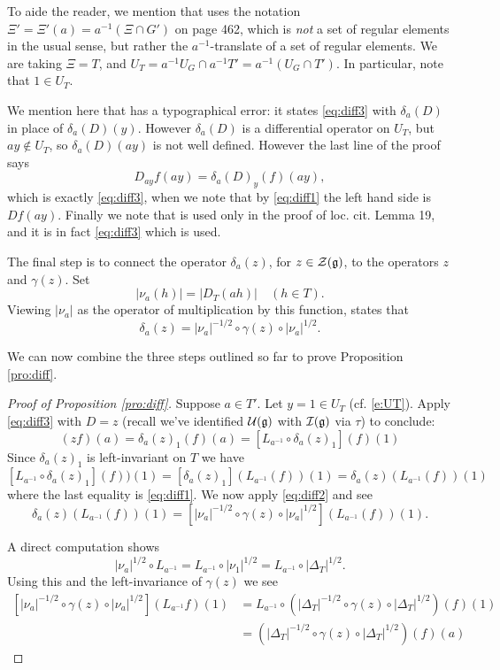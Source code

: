 \documentclass{article}
\theoremstyle{definition}
\numberwithin{equation}{section}
\renewcommand{\-}{\hyp{}}
\newcommand{\g}{\mathfrak g}
\begin{document}
To aide the reader, we mention that \cite[Lemma 18]{HC_inv_eigen} uses the notation $\Xi'=\Xi'(a)=a^{-1}(\Xi\cap G')$ on page 462, which is \emph{not} a set of regular elements in the usual sense, but rather the $a^{-1}$-translate of a set of regular elements. We are taking $\Xi=T$, and $U_T=a^{-1}U_G \cap a^{-1}T'=a^{-1}(U_G\cap T')$. In particular, note that $1 \in U_T$.


We mention here that  \cite[Lemma 18]{HC_inv_eigen} has a typographical error: it states \eqref{eq:diff3} with $\delta_a(D)$ in place of  $\delta_a(D)(y)$.  However $\delta_a(D)$ is a differential operator on $U_T$, but $ay\not\in U_T$, so $\delta_a(D)(ay)$ is not well defined.
However the last line of the proof  says
\[ D_{ay}f(ay) = \delta_a(D)_y(f)(ay), \]
which is exactly \eqref{eq:diff3}, when we note that by \eqref{eq:diff1}  the left hand side is $Df(ay)$.
Finally we note that \cite[Lemma 18]{HC_inv_eigen} is used only in the proof of loc. cit. Lemma 19, and it is in fact \eqref{eq:diff3} which is used.



The final step is to connect the operator $\delta_a(z)$, for $z \in \mathcal{Z}(\mathfrak{g})$, to the operators $z$ and $\gamma(z)$.
Set 
\[
|\nu_a(h)| = |D_T(ah)|\quad(h\in T).
\]
Viewing $|\nu_a|$ as the operator of multiplication by this function, 
\cite[\S6, Lemma 13]{HC_inv_eigen} states that
\begin{equation} \label{eq:diff2}
\delta_a(z) = |\nu_a|^{-1/2} \circ \gamma(z) \circ |\nu_a|^{1/2}.
\end{equation}

We can now combine the three steps outlined so far to prove Proposition \ref{pro:diff}.
\begin{proof}[Proof of Proposition \ref{pro:diff}]
Suppose $a\in T'$. Let $y=1\in U_T$ (cf. \eqref{e:UT}). Apply \eqref{eq:diff3} with $D=z$ 
(recall we've identified $\mc{U}(\g)$ with $\mc{I}(\g)$ via $\tau$)
to conclude:
\[
 (zf)(a) = \delta_a(z)_1(f)(a) =[L_{a^{-1}}\circ\delta_a(z)_1](f)(1)
\]
Since $\delta_a(z)_1$ is left-invariant on $T$ we have
\[
[L_{a^{-1}}\circ\delta_a(z)_1](f))(1)=[\delta_a(z)_1](L_{a^{-1}}(f))(1)=\delta_a(z)(L_{a^{-1}}(f))(1)
\]
where the last equality is \eqref{eq:diff1}.
We now apply \eqref{eq:diff2} and see
\[ \delta_a(z)(L_{a^{-1}}(f))(1) = [|\nu_a|^{-1/2} \circ \gamma(z) \circ |\nu_a|^{1/2}](L_{a^{-1}}(f))(1). 
\]

A direct computation shows 
$$
|\nu_a|^{1/2} \circ L_{a^{-1}}=L_{a^{-1}} \circ |\nu_1|^{1/2}=L_{a^{-1}} \circ |\Delta_T|^{1/2}.
$$
Using this and the left-invariance of $\gamma(z)$ we see 
\[ 
\begin{aligned}
[|\nu_a|^{-1/2} \circ \gamma(z) \circ |\nu_a|^{1/2}](L_{a^{-1}}f)(1) &= L_{a^{-1}}\circ(|\Delta_T|^{-1/2} \circ \gamma(z) \circ |\Delta_T|^{1/2})(f)(1)\\
&=(|\Delta_T|^{-1/2} \circ \gamma(z) \circ |\Delta_T|^{1/2})(f)(a)
\end{aligned}
\]

\end{proof}
\end{document}
